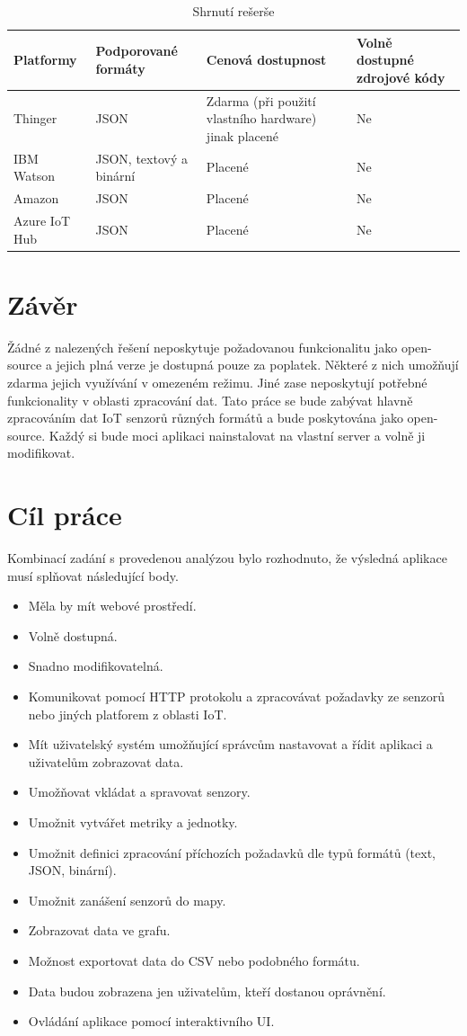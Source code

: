 \documentclass[thesis=M,czech]{FITthesis}[2018/10/20]
\begin{document}
\begin{table}[H]\centering
	\caption{Shrnutí rešerše}\label{tab:shrnuti}
\begin{tabular}{ |p{2.5cm}||p{2.5cm}|p{3.5cm}|p{2.6cm}|  }
 \hline
 Platformy & Podporované formáty & Cenová dostupnost & Volně dostupné zdrojové kódy  \\
 \hline
 \hline
 Thinger & JSON & Zdarma (při použití vlastního hardware) jinak placené & Ne \\
 \hline
 IBM Watson & JSON, textový a binární & Placené & Ne \\
 \hline
 Amazon & JSON & Placené & Ne\\
 \hline
 Azure IoT Hub & JSON & Placené & Ne \\
 \hline
\end{tabular}
\end{table}
\newpage
\section{Závěr}
Žádné z nalezených řešení neposkytuje požadovanou funkcionalitu jako open-source a jejich plná verze je dostupná pouze za poplatek. Některé z nich umožňují zdarma jejich využívání v omezeném režimu. Jiné zase neposkytují potřebné funkcionality v oblasti zpracování dat. Tato práce se bude zabývat hlavně zpracováním dat IoT senzorů různých formátů a bude poskytována jako open-source. Každý si bude moci aplikaci nainstalovat na vlastní server a volně ji modifikovat. 

\section{Cíl práce}
Kombinací zadání s provedenou analýzou bylo rozhodnuto, že výsledná aplikace musí splňovat následující body.
\begin{itemize}
  \item Měla by mít webové prostředí.
  \item Volně dostupná.
  \item Snadno modifikovatelná.
  \item Komunikovat pomocí HTTP protokolu a zpracovávat požadavky ze senzorů nebo jiných platforem z oblasti IoT.
  \item Mít uživatelský systém umožňující správcům nastavovat a řídit aplikaci a uživatelům zobrazovat data.
  \item Umožňovat vkládat a spravovat senzory.
  \item Umožnit vytvářet metriky a jednotky.
  \item Umožnit definici zpracování příchozích požadavků dle typů formátů (text, JSON, binární).
  \item Umožnit zanášení senzorů do mapy.
  \item Zobrazovat data ve grafu.
  \item Možnost exportovat data do CSV nebo podobného formátu.
  \item Data budou zobrazena jen uživatelům, kteří dostanou oprávnění.
  \item Ovládání aplikace pomocí interaktivního UI.
\end{itemize}
\end{document}
